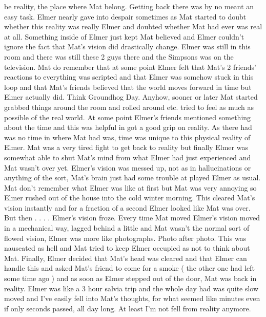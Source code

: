 \documentclass[12pt]{book}
\begin{document}
be reality, the place where Mat belong. Getting back there was by no meant an easy task. Elmer nearly gave into despair sometimes as Mat started to doubt whether this reality was really Elmer and doubted whether Mat had ever was real at all. Something inside of Elmer just kept Mat believed and Elmer couldn't ignore the fact that Mat's vision did drastically change. Elmer was still in this room and there was still these 2 guys there and the Simpsons was on the television. Mat do remember that at some point Elmer felt that Mat's 2 friends' reactions to everything was scripted and that Elmer was somehow stuck in this loop and that Mat's friends believed that the world moves forward in time but Elmer actually did. Think Groundhog Day. Anyhow, sooner or later Mat started grabbed things around the room and rolled around etc. tried to feel as much as possible of the real world. At some point Elmer's friends mentioned something about the time and this was helpful in got a good grip on reality. As there had was no time in where Mat had was, time was unique to this physical reality of Elmer. Mat was a very tired fight to get back to reality but finally Elmer was somewhat able to shut Mat's mind from what Elmer had just experienced and Mat wasn't over yet. Elmer's vision was messed up, not as in hallucinations or anything of the sort, Mat's brain just had some trouble at played Elmer as usual. Mat don't remember what Elmer was like at first but Mat was very annoying so Elmer rushed out of the house into the cold winter morning. This cleared Mat's vision instantly and for a fraction of a second Elmer looked like Mat was over. But then . . .  . Elmer's vision froze. Every time Mat moved Elmer's vision moved in a mechanical way, lagged behind a little and Mat wasn't the normal sort of flowed vision, Elmer was more like photographs. Photo after photo. This was nauseated as hell and Mat tried to keep Elmer occupied as not to think about Mat. Finally, Elmer decided that Mat's head was cleared and that Elmer can handle this and asked Mat's friend to come for a smoke ( the other one had left some time ago ) and as soon as Elmer stepped out of the door, Mat was back in reality. Elmer was like a 3 hour salvia trip and the whole day had was quite slow moved and I've easily fell into Mat's thoughts, for what seemed like minutes even if only seconds passed, all day long. At least I'm not fell from reality anymore.
\end{document}

